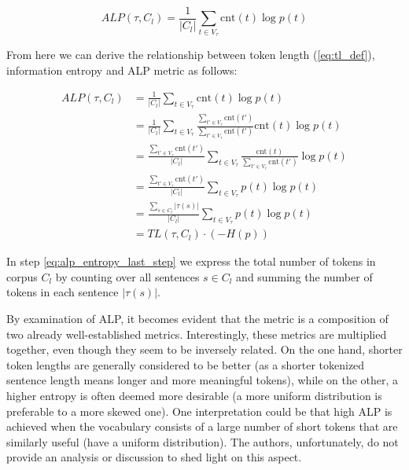 \begin{equation}
    ALP(\tau, C_l) = \frac{1}{|C_l|} \sum_{t \in V_\tau} \mathrm{cnt}(t) \log p(t)
\end{equation}

From here we can derive the relationship between token length (\autoref{eq:tl_def}), information entropy and ALP metric as follows:

\begin{align}
ALP(\tau, C_l) &= \frac{1}{|C_l|} \sum_{t \in V_\tau} \mathrm{cnt}(t) \log p(t) \\
&= \frac{1}{|C_l|} \sum_{t \in V_\tau} \frac{\sum_{t' \in V_\tau} \mathrm{cnt}(t')}{\sum_{t' \in V_\tau} \mathrm{cnt}(t')} \mathrm{cnt}(t) \log p(t) \\
&= \frac{\sum_{t' \in V_\tau} \mathrm{cnt}(t')}{|C_l|} \sum_{t \in V_\tau} \frac{\mathrm{cnt}(t)}{\sum_{t' \in V_\tau} \mathrm{cnt}(t')} \log p(t) \\
&= \frac{\sum_{t' \in V_\tau} \mathrm{cnt}(t')}{|C_l|} \sum_{t \in V_\tau} p(t) \log p(t) \\
&= \frac{\sum_{s \in C_l}|\tau(s)|}{|C_l|} \sum_{t \in V_\tau} p(t) \log p(t) \label{eq:alp_entropy_last_step}\\
&= TL(\tau, C_l) \cdot (- H(p))
\end{align}

In step \ref{eq:alp_entropy_last_step} we express the total number of tokens in corpus $C_l$ by counting over all sentences $s \in C_l$ and summing the number of tokens in each sentence $|\tau(s)|$.


By examination of ALP, it becomes evident that the metric is a composition of two already well-established metrics. Interestingly, these metrics are multiplied together, even though they seem to be inversely related. On the one hand, shorter token lengths are generally considered to be better (as a shorter tokenized sentence length means longer and more meaningful tokens), while on the other, a higher entropy is often deemed more desirable (a more uniform distribution is preferable to a more skewed one). One interpretation could be that high ALP is achieved when the vocabulary consists of a large number of short tokens that are similarly useful (have a uniform distribution). The authors, unfortunately, do not provide an analysis or discussion to shed light on this aspect.

